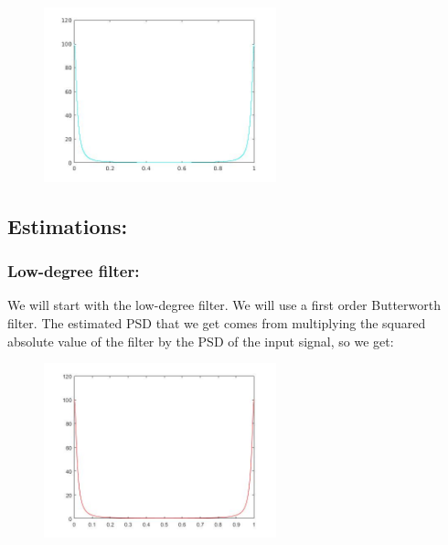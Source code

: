 \documentclass[a4paper,11pt]{article}
\begin{document}
\begin{figure}[!hp]
    \begin{center}
      \includegraphics[width=0.6\textwidth]{images/lab1_35.jpg}
    \end{center}
\end{figure}

\newpage

\subsection{Estimations:}

\subsubsection{Low-degree filter:}

We will start with the low-degree filter. We will use a first order Butterworth filter. The estimated PSD that we get comes from multiplying the squared absolute value of the filter by the PSD of the input signal, so we get:

\begin{figure}[!hp]
    \begin{center}
    \includegraphics[width=0.6\textwidth]{images/lab1_figure1_3.jpg}
    \end{center}
\end{figure}
\end{document}
